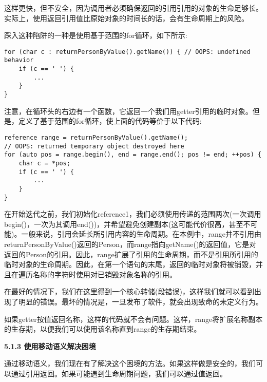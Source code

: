 这样更快，但不安全，因为调用者必须确保返回的引用引用的对象的生命足够长。实际上，使用返回引用值比原始对象的时间长的话，会有生命周期上的风险。\par

踩入这种陷阱的一种是使用基于范围的for循环，如下所示:\par

\begin{lstlisting}[caption={}]
for (char c : returnPersonByValue().getName()) { // OOPS: undefined behavior
	if (c == ' ') {
		...
	}
}
\end{lstlisting}

注意，在循环头的右边有一个函数，它返回一个我们用getter引用的临时对象。但是，定义了基于范围的for循环，使上面的代码等价于以下代码:\par

\begin{lstlisting}[caption={}]
reference range = returnPersonByValue().getName();
// OOPS: returned temporary object destroyed here
for (auto pos = range.begin(), end = range.end(); pos != end; ++pos) {
	char c = *pos;
	if (c == ' ') {
		...
	}
}
\end{lstlisting}

在开始迭代之前，我们初始化reference1，我们必须使用传递的范围两次(一次调用begin()，一次为其调用end())，并希望避免创建副本(这可能代价很高，甚至不可能)。一般来说，引用会延长所引用内容的生命周期。在本例中，range并不引用由returnPersonByValue()返回的Person，而range指向getName()的返回值，它是对返回的Person的引用。因此，range扩展了引用的生命周期，而不是引用所引用的临时对象的生命周期。因此，在第一个语句的末尾，返回的临时对象将被销毁，并且在遍历名称的字符时使用对已销毁对象名称的引用。\par

在最好的情况下，我们在这里得到一个核心转储(段错误)，这样我们就可以看到出现了明显的错误。最坏的情况是，一旦发布了软件，就会出现致命的未定义行为。\par

如果getter按值返回名称，这样的代码就不会有问题。这样，range将扩展名称副本的生存期，以便我们可以使用该名称直到range的生存期结束。\par

\hspace*{\fill} \par %
\textbf{5.1.3 使用移动语义解决困境}

通过移动语义，我们现在有了解决这个困境的方法。如果这样做是安全的，我们可以通过引用返回。如果可能遇到生命周期问题，我们可以通过值返回。\par

